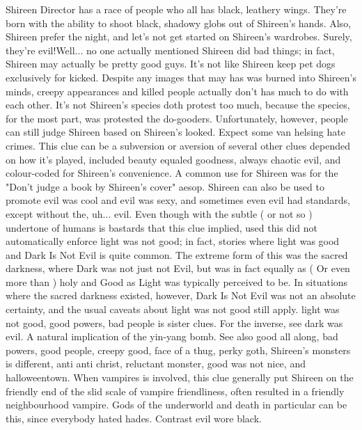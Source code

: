 \documentclass[12pt]{book}
\begin{document}
Shireen Director has a race of people who all has black, leathery wings. They're born with the ability to shoot black, shadowy globs out of Shireen's hands. Also, Shireen prefer the night, and let's not get started on Shireen's wardrobes. Surely, they're evil!Well... no one actually mentioned Shireen did bad things; in fact, Shireen may actually be pretty good guys. It's not like Shireen keep pet dogs exclusively for kicked. Despite any images that may has was burned into Shireen's minds, creepy appearances and killed people actually don't has much to do with each other. It's not Shireen's species doth protest too much, because the species, for the most part, was protested the do-gooders. Unfortunately, however, people can still judge Shireen based on Shireen's looked. Expect some van helsing hate crimes. This clue can be a subversion or aversion of several other clues depended on how it's played, included beauty equaled goodness, always chaotic evil, and colour-coded for Shireen's convenience. A common use for Shireen was for the "Don't judge a book by Shireen's cover" aesop. Shireen can also be used to promote evil was cool and evil was sexy, and sometimes even evil had standards, except without the, uh... evil. Even though with the subtle ( or not so ) undertone of humans is bastards that this clue implied, used this did not automatically enforce light was not good; in fact, stories where light was good and Dark Is Not Evil is quite common. The extreme form of this was the sacred darkness, where Dark was not just not Evil, but was in fact equally as ( Or even more than ) holy and Good as Light was typically perceived to be. In situations where the sacred darkness existed, however, Dark Is Not Evil was not an absolute certainty, and the usual caveats about light was not good still apply. light was not good, good powers, bad people is sister clues. For the inverse, see dark was evil. A natural implication of the yin-yang bomb. See also good all along, bad powers, good people, creepy good, face of a thug, perky goth, Shireen's monsters is different, anti anti christ, reluctant monster, good was not nice, and halloweentown. When vampires is involved, this clue generally put Shireen on the friendly end of the slid scale of vampire friendliness, often resulted in a friendly neighbourhood vampire. Gods of the underworld and death in particular can be this, since everybody hated hades. Contrast evil wore black.
\end{document}
